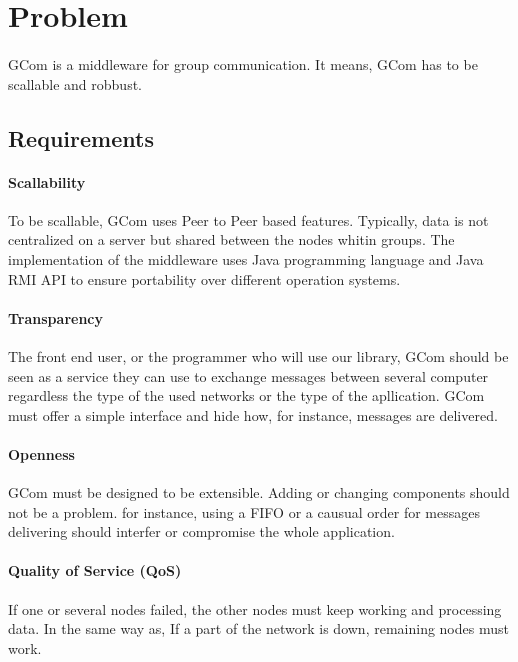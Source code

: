 \section{Problem}

\paragraph{}{
	GCom is a middleware for group communication. It means,
 GCom has to be scallable and robbust.
}

\subsection{Requirements}

\paragraph{Scallability}{
	To be scallable, GCom uses Peer to Peer based features.
 Typically, data is not centralized on a server but shared 
 between the nodes whitin groups. The implementation of the
 middleware uses Java programming language and Java RMI API to
 ensure portability over different operation systems.
}

\paragraph{Transparency}{
	The front end user, or the programmer who will use our
 library, GCom should be seen as a service they can use to
 exchange messages between several computer regardless the
 type of the used networks or the type of the apllication.
 GCom must offer a simple interface and hide how, for
 instance, messages are delivered.
}

\paragraph{Openness}{
	GCom must be designed to be extensible. Adding or changing 
 components should not be a problem. for instance, using a FIFO
 or a causual order for messages delivering should interfer or
 compromise the whole application.
}

\paragraph{Quality of Service (QoS)}{
	If one or several nodes failed, the other nodes must keep
 working and processing data. In the same way as, If a part of
 the network is down, remaining nodes must work.
}

